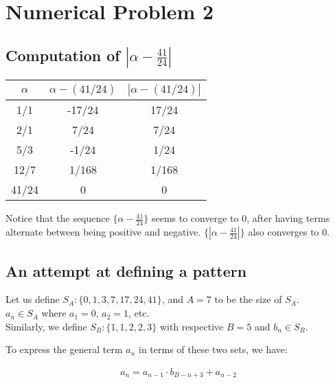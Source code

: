 \documentclass[12pt]{article}
\begin{document}
\pagebreak

\section{Numerical Problem 2}

	\subsection{Computation of $\left| \alpha - \frac{41}{24} \right|$}

		\begin{table}[h!]
			\centering
			\begin{tabular}{c|c|c}
				$\alpha$ & $\alpha - (41/24)$ & $\left| \alpha - (41/24)\right|$ \\
				\hline
				1/1      & -17/24             & 17/24                          \\
				2/1      & 7/24               & 7/24                           \\
				5/3      & -1/24              & 1/24                           \\
				12/7     & 1/168              & 1/168                          \\
				41/24    & 0                  & 0                             
			\end{tabular}
		\end{table}

		Notice that the sequence $\{\alpha - \frac{41}{24}\}$ seems to converge to 0, after having terms alternate between being positive and negative. $\{\left|\alpha - \frac{41}{24}\right|\}$ also converges to 0.

	\subsection{An attempt at defining a pattern}

		Let us define $S_A : \{0, 1, 3, 7, 17, 24, 41\}$, and $A=7$ to be the size of $S_A$.\\
		$a_n \in S_A$ where $a_1 = 0$, $a_2 = 1$, etc.\\

		Similarly, we define $S_B : \{1, 1, 2, 2, 3\}$ with respective $B=5$ and $b_n \in S_B$.

		To express the general term $a_n$ in terms of these two sets, we have:

		\begin{align*}
			a_n = a_{n-1} \cdot b_{B-n+3} + a_{n-2}
		\end{align*}
\end{document}
